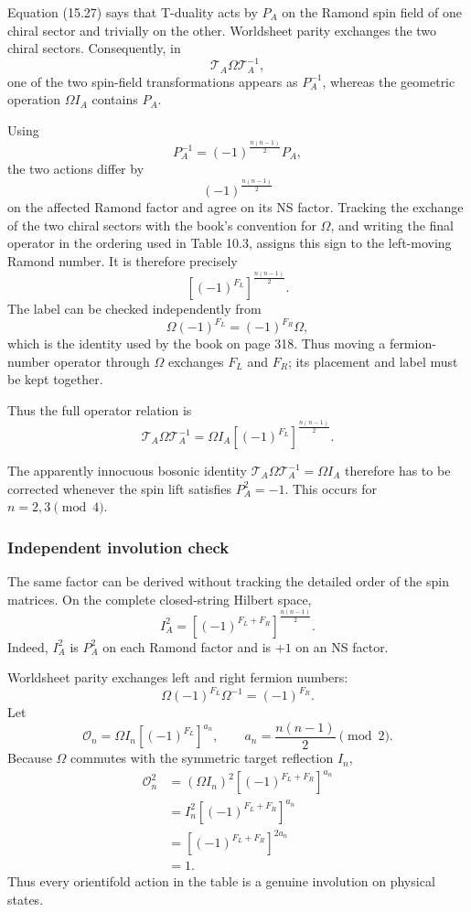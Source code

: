 \documentclass[
  10pt,
  a4paper,
  openany]{book}
\begin{document}
Equation (15.27) says that T-duality acts by \(P_A\) on the Ramond spin
field of one chiral sector and trivially on the other. Worldsheet parity
exchanges the two chiral sectors. Consequently, in \[
\mathcal T_A\Omega\mathcal T_A^{-1},
\] one of the two spin-field transformations appears as \(P_A^{-1}\),
whereas the geometric operation \(\Omega I_A\) contains \(P_A\).

Using \[
P_A^{-1}
=
(-1)^{\frac{n(n-1)}2}P_A,
\] the two actions differ by \[
(-1)^{\frac{n(n-1)}2}
\] on the affected Ramond factor and agree on its NS factor. Tracking
the exchange of the two chiral sectors with the book's convention for
\(\Omega\), and writing the final operator in the ordering used in Table
10.3, assigns this sign to the left-moving Ramond number. It is
therefore precisely \[
\left[(-1)^{F_L}\right]^{\frac{n(n-1)}2}.
\] The label can be checked independently from \[
\Omega(-1)^{F_L}
=
(-1)^{F_R}\Omega,
\] which is the identity used by the book on page 318. Thus moving a
fermion-number operator through \(\Omega\) exchanges \(F_L\) and
\(F_R\); its placement and label must be kept together.

Thus the full operator relation is \[
\boxed{
\mathcal T_A\Omega\mathcal T_A^{-1}
=
\Omega I_A
\left[(-1)^{F_L}\right]^{\frac{n(n-1)}2}
}.
\]

The apparently innocuous bosonic identity
\(\mathcal T_A\Omega\mathcal T_A^{-1}=\Omega I_A\) therefore has to be
corrected whenever the spin lift satisfies \(P_A^2=-1\). This occurs for
\(n=2,3\pmod4\).

\subsubsection{Independent involution
check}\label{independent-involution-check}

The same factor can be derived without tracking the detailed order of
the spin matrices. On the complete closed-string Hilbert space, \[
I_A^2
=
\left[
(-1)^{F_L+F_R}
\right]^{\frac{n(n-1)}2}.
\] Indeed, \(I_A^2\) is \(P_A^2\) on each Ramond factor and is \(+1\) on
an NS factor.

Worldsheet parity exchanges left and right fermion numbers: \[
\Omega(-1)^{F_L}\Omega^{-1}
=
(-1)^{F_R}.
\] Let \[
\mathcal O_n
=
\Omega I_n
\left[(-1)^{F_L}\right]^{a_n},
\qquad
a_n=\frac{n(n-1)}2\pmod2.
\] Because \(\Omega\) commutes with the symmetric target reflection
\(I_n\), \[
\begin{aligned}
\mathcal O_n^2
&=
(\Omega I_n)^2
\left[(-1)^{F_L+F_R}\right]^{a_n}\\
&=
I_n^2
\left[(-1)^{F_L+F_R}\right]^{a_n}\\
&=
\left[(-1)^{F_L+F_R}\right]^{2a_n}\\
&=1.
\end{aligned}
\] Thus every orientifold action in the table is a genuine involution on
physical states.
\end{document}
